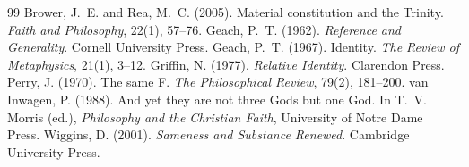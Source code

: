 \documentclass{situationist-preprint}
\begin{document}
\begin{thebibliography}{99}\small
{} Brower, J.~E. and Rea, M.~C. (2005). Material constitution and the Trinity. \emph{Faith and Philosophy}, 22(1), 57--76.
 Geach, P.~T. (1962). \emph{Reference and Generality}. Cornell University Press.
 Geach, P.~T. (1967). Identity. \emph{The Review of Metaphysics}, 21(1), 3--12.
 Griffin, N. (1977). \emph{Relative Identity}. Clarendon Press.
 Perry, J. (1970). The same F. \emph{The Philosophical Review}, 79(2), 181--200.
 van Inwagen, P. (1988). And yet they are not three Gods but one God. In T.~V. Morris (ed.), \emph{Philosophy and the Christian Faith}, University of Notre Dame Press.
 Wiggins, D. (2001). \emph{Sameness and Substance Renewed}. Cambridge University Press.
\end{thebibliography}
\end{document}
